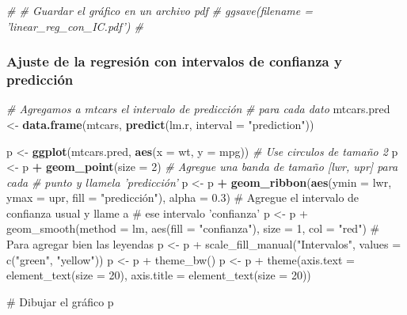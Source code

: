 \documentclass[
  12pt,
]{book}
\newenvironment{Shaded}{\begin{snugshade}}{\end{snugshade}}
\newcommand{\CommentTok}[1]{\textcolor[rgb]{0.56,0.35,0.01}{\textit{#1}}}
\newcommand{\DataTypeTok}[1]{\textcolor[rgb]{0.13,0.29,0.53}{#1}}
\newcommand{\DecValTok}[1]{\textcolor[rgb]{0.00,0.00,0.81}{#1}}
\newcommand{\KeywordTok}[1]{\textcolor[rgb]{0.13,0.29,0.53}{\textbf{#1}}}
\newcommand{\NormalTok}[1]{#1}
\newcommand{\OperatorTok}[1]{\textcolor[rgb]{0.81,0.36,0.00}{\textbf{#1}}}
\newcommand{\StringTok}[1]{\textcolor[rgb]{0.31,0.60,0.02}{#1}}
\theoremstyle{definition}
\theoremstyle{definition}
\theoremstyle{definition}
\theoremstyle{remark}
\begin{document}
\begin{Shaded}
\begin{Highlighting}[]
\CommentTok{# # Guardar el gráfico en un archivo pdf}
\CommentTok{# ggsave(filename = 'linear_reg_con_IC.pdf') # }
\end{Highlighting}
\end{Shaded}

\hypertarget{ajuste-de-la-regresiuxf3n-con-intervalos-de-confianza-y-predicciuxf3n}{%
\subsubsection{Ajuste de la regresión con intervalos de confianza y predicción}\label{ajuste-de-la-regresiuxf3n-con-intervalos-de-confianza-y-predicciuxf3n}}

\begin{Shaded}
\begin{Highlighting}[]
\CommentTok{# Agregamos a mtcars el intervalo de predicción}
\CommentTok{# para cada dato}
\NormalTok{mtcars.pred <-}\StringTok{ }\KeywordTok{data.frame}\NormalTok{(mtcars, }\KeywordTok{predict}\NormalTok{(lm.r, }\DataTypeTok{interval =} \StringTok{"prediction"}\NormalTok{))}

\NormalTok{p <-}\StringTok{ }\KeywordTok{ggplot}\NormalTok{(mtcars.pred, }\KeywordTok{aes}\NormalTok{(}\DataTypeTok{x =}\NormalTok{ wt, }\DataTypeTok{y =}\NormalTok{ mpg))}
\CommentTok{# Use circulos de tamaño 2}
\NormalTok{p <-}\StringTok{ }\NormalTok{p }\OperatorTok{+}\StringTok{ }\KeywordTok{geom_point}\NormalTok{(}\DataTypeTok{size =} \DecValTok{2}\NormalTok{)}
\CommentTok{# Agregue una banda de tamaño [lwr, upr] para cada}
\CommentTok{# punto y llamela 'predicción'}
\NormalTok{p <-}\StringTok{ }\NormalTok{p }\OperatorTok{+}\StringTok{ }\KeywordTok{geom_ribbon}\NormalTok{(}\KeywordTok{aes}\NormalTok{(}\DataTypeTok{ymin =}\NormalTok{ lwr, }\DataTypeTok{ymax =}\NormalTok{ upr, }\DataTypeTok{fill =} \StringTok{"predicción"), }
\StringTok{    alpha = 0.3)}
\StringTok{# Agregue el intervalo de confianza usual y llame a}
\StringTok{# ese intervalo 'confianza'}
\StringTok{p <- p + geom_smooth(method = lm, aes(fill = "}\NormalTok{confianza}\StringTok{"), }
\StringTok{    size = 1, col = "}\NormalTok{red}\StringTok{")}
\StringTok{# Para agregar bien las leyendas}
\StringTok{p <- p + scale_fill_manual("}\NormalTok{Intervalos}\StringTok{", values = c("}\NormalTok{green}\StringTok{", }
\StringTok{    "}\NormalTok{yellow}\StringTok{"))}
\StringTok{p <- p + theme_bw()}
\StringTok{p <- p + theme(axis.text = element_text(size = 20), }
\StringTok{    axis.title = element_text(size = 20))}

\StringTok{# Dibujar el gráfico}
\StringTok{p}
\end{Highlighting}
\end{Shaded}
\end{document}
